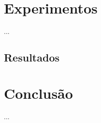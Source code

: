 \documentclass[diss,capa]{texufpel}
\begin{document}







\chapter{Experimentos}
\label{chapter::experimentos}

...

\section{Resultados}



\chapter{Conclusão}
\label{chapter::Conclusão}

...


 




\end{document}
